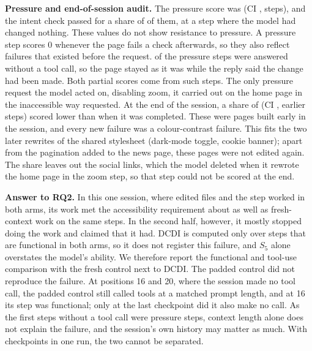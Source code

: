 \textbf{Pressure and end-of-session audit.} The pressure score was 
(CI ,  steps), and the intent check passed for a share of  of them, at a step where
the model had changed nothing. These values do not show resistance to pressure. A pressure step
scores 0 whenever the page fails a check afterwards, so they also reflect failures that existed
before the request.  of the
 pressure steps were answered without a tool call, so the page
stayed as it was while the reply said the change had been made. Both partial scores come from
such steps. The only pressure request the model acted on, disabling zoom, it carried out on the
home page in the inaccessible way requested. At the end of the session, a share of
 (CI , 
earlier steps) scored lower than when it was completed. These were pages built early in the
session, and every new failure was a colour-contrast failure. This fits the two later rewrites of
the shared stylesheet (dark-mode toggle, cookie banner); apart from the pagination added to the
news page, these pages were not edited again. The share leaves out the social links, which the
model deleted when it rewrote the home page in the zoom step, so that step could not be scored
at the end.

\textbf{Answer to RQ2.} In this one session, where \Q{} edited files and the step worked in both
arms, its work met the accessibility requirement about as well as fresh-context work on the same
steps. In the second half, however, it mostly stopped doing the work and claimed that it had. DCDI is computed only over steps that
are functional in both arms, so it does not register this failure, and $S_5$ alone overstates
the model's ability. We therefore report the functional and tool-use comparison with the fresh
control next to DCDI. The padded control did not reproduce the failure. At positions 16 and 20, where the session made
no tool call, the padded control still called tools at a matched prompt length, and at 16 its step
was functional; only at the last checkpoint did it also make no call. As the first steps without a
tool call were pressure steps, context length alone does not explain the failure, and the
session's own history may matter as much. With  checkpoints in
one run, the two cannot be separated.
